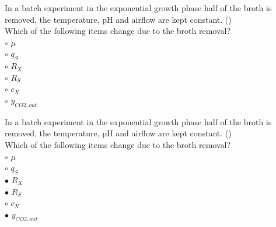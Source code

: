 \documentclass[]{beamer}
\begin{document}
\begin{frame}[shrink] {}
\color{blue}
In a batch experiment in the exponential growth phase half of the broth is removed, the temperature, pH and airflow are kept constant.
({\color{green}{Q7}})\\
Which of the following items change due to the broth removal?
\\
\color{black}
\setlength{\parindent}{-0.4cm}
{\color{red}$\circ$} $\mu$  \\
{\color{red}$\circ$} $q_{S}$  \\
{\color{red}$\circ$} $R_{X}$  \\
{\color{red}$\circ$} $R_{S}$  \\
{\color{red}$\circ$} $c_{X}$  \\
{\color{red}$\circ$} $y_{CO2,out}$  \\
\end{frame}
\begin{frame}[shrink] {}
\color{blue}
In a batch experiment in the exponential growth phase half of the broth is removed, the temperature, pH and airflow are kept constant.
({\color{green}{Q7}})\\
Which of the following items change due to the broth removal?
\\
\color{black}
\setlength{\parindent}{-0.4cm}
{\color{red}$\circ$} $\mu$  \\
{\color{red}$\circ$} $q_{S}$  \\
{\color{red}$\bullet$} $R_{X}$  \\
{\color{red}$\bullet$} $R_{S}$  \\
{\color{red}$\circ$} $c_{X}$  \\
{\color{red}$\bullet$} $y_{CO2,out}$  \\
\end{frame}
\end{document}
